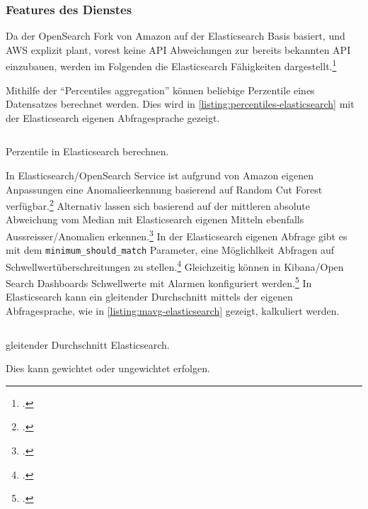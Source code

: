 \subsubsection{Features des Dienstes}
Da der OpenSearch Fork von Amazon auf der Elasticsearch Basis basiert, und \ac{AWS} explizit plant, vorest keine \ac{API} Abweichungen zur bereits bekannten \ac{API} einzubauen, werden im Folgenden die Elasticsearch Fähigkeiten dargestellt.\footcite[Vgl.][]{Meadows.2021}

Mithilfe der \enquote{Percentiles aggregation} können beliebige Perzentile eines Datensatzes berechnet werden. Dies wird in \autoref{listing:percentiles-elasticsearch} mit der Elasticsearch eigenen Abfragesprache gezeigt. 
\begin{listing}[H]
\inputminted[frame=lines,breaklines=true]{json}{code/elasticsearch/percentiles.json}
\caption[Perzentile in Elasticsearch berechnen]{Perzentile in Elasticsearch berechnen.\footnotemark}
\label{listing:percentiles-elasticsearch}
\end{listing}
In Elasticsearch/OpenSearch Service ist aufgrund von Amazon eigenen Anpassungen eine Anomalieerkennung basierend auf Random Cut Forest verfügbar.\footcite[Vgl.][]{AmazonWebServicesInc..o.J.al}
Alternativ lassen sich basierend auf der mittleren absolute Abweichung vom Median mit Elasticsearch eigenen Mitteln ebenfalls Aussreisser/Anomalien erkennen.\footcite[Vgl.][]{ElasticsearchInc..o.J.c} 
In der Elasticsearch eigenen Abfrage gibt es mit dem \texttt{minimum_should_match} Parameter, eine Möglichlkeit Abfragen auf Schwellwertüberschreitungen zu stellen.\footcite[Vgl.][]{ElasticsearchInc..o.J.e}
Gleichzeitig können in Kibana/Open Search Dashboards Schwellwerte mit Alarmen konfiguriert werden.\footcite[Vgl.][]{Handler.2019}
In Elasticsearch kann ein gleitender Durchschnitt mittels der eigenen Abfragesprache, wie in \autoref{listing:mavg-elasticsearch} gezeigt, kalkuliert werden.

\begin{listing}[H]
\inputminted[frame=lines,breaklines=true]{json}{code/elasticsearch/mavg.json}
\caption[gleitender Durchschnitt Elasticsearch]{gleitender Durchschnitt Elasticsearch.\footnotemark}
\label{listing:mavg-elasticsearch}
\end{listing}

Dies kann gewichtet oder ungewichtet erfolgen.

